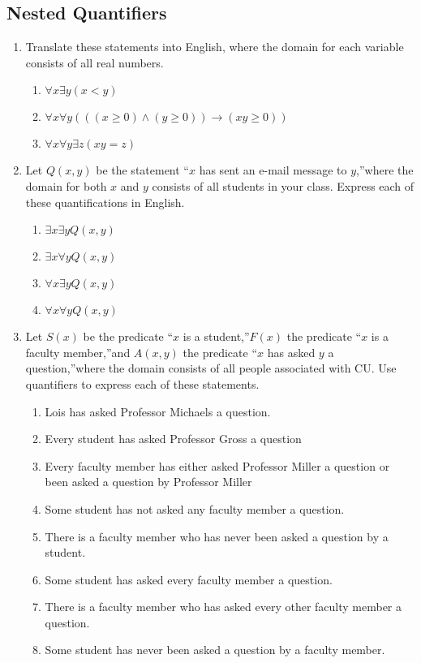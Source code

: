 \documentclass{sig-alternate-05-2015}
\begin{document}
\subsection{Nested Quantifiers}

\begin{enumerate}
\item Translate these statements into English, where the domain
for each variable consists of all real numbers.
\begin{enumerate}
	\item $\forall x \exists y (x < y)$
	\item $\forall x \forall y (((x \ge 0) \wedge (y \ge 0)) \rightarrow (x y \ge 0))$
	\item $\forall x \forall y \exists z (x y = z)$
\end{enumerate}

\item Let $Q(x, y)$ be the statement \textquotedblleft $x$ has sent an e-mail message
to $y$,\textquotedblright where the domain for both $x$ and $y$ consists of
all students in your class. Express each of these quantifications in English.
\begin{enumerate}
	\item $\exists x \exists y Q(x, y)$
	\item $\exists x \forall y Q(x, y)$
	\item $\forall x \exists y Q(x, y)$
	\item $\forall x \forall y Q(x, y)$
\end{enumerate}

\item Let $S(x)$ be the predicate \textquotedblleft $x$ is a student,\textquotedblright $F(x)$ the predicate
\textquotedblleft $x$ is a faculty member,\textquotedblright and $A(x, y)$ the predicate
\textquotedblleft $x$ has asked $y$ a question,\textquotedblright where the domain consists of
all people associated with CU. Use quantifiers to
express each of these statements.
\begin{enumerate}
	\item Lois has asked Professor Michaels a question.
	\item Every student has asked Professor Gross a question
	\item Every faculty member has either asked Professor
	Miller a question or been asked a question by Professor
	Miller
	\item Some student has not asked any faculty member a
	question.
	\item There is a faculty member who has never been asked
	a question by a student.
	\item Some student has asked every faculty member a question.
	\item There is a faculty member who has asked every other
	faculty member a question.
	\item Some student has never been asked a question by a
	faculty member.
\end{enumerate}
	

\end{enumerate}
\end{document}
